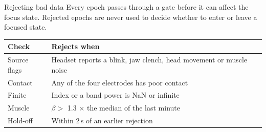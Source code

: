 \documentclass[aspectratio=169,11pt]{beamer}
\begin{document}
\begin{frame}{Rejecting bad data}
  Every epoch passes through a gate before it can affect the focus state.
  Rejected epochs are never used to decide whether to enter or leave a focused state.

  \vspace{0.2cm}
  \small
  \begin{center}
    \begin{tabular}{@{}l l@{}}
      \toprule
      \textbf{Check} & \textbf{Rejects when} \\
      \midrule
      Source flags   & Headset reports a blink, jaw clench, head movement or muscle noise \\
      Contact        & Any of the four electrodes has poor contact \\
      Finite         & Index or a band power is NaN or infinite \\
      Muscle         & $\beta > $ 1.3 $\times$ the median of the last minute \\
      Hold-off       & Within 2\,s of an earlier rejection \\
      \bottomrule
    \end{tabular}
  \end{center}

\end{frame}
\end{document}
